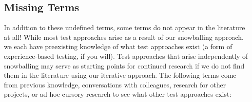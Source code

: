 
\clearpage
\subsection{Missing Terms}\label{future-miss-terms}
In addition to these undefined terms, some terms do not appear in
the literature at all! While most test approaches arise as a result of our
snowballing approach, we each have preexisting knowledge of what test
approaches exist (a form of experience-based testing, if you will).
Test approaches that arise independently of snowballing may
serve as starting points for continued research if we do not find them in
the literature using our iterative approach. The following terms come from
previous knowledge, conversations with colleagues, research for other
projects, or ad hoc cursory research to see what other test approaches exist:
\newline

